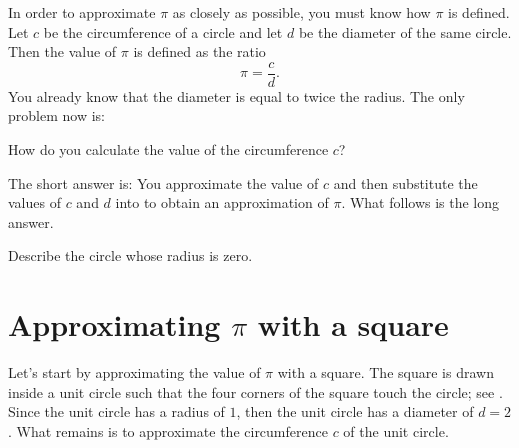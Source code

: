 \documentclass[a4paper,oneside,12pt]{article}
\begin{document}
In order to approximate $\pi$ as closely as possible, you must know
how $\pi$ is defined.  Let $c$ be the circumference of a circle and
let $d$ be the diameter of the same circle.  Then the value of $\pi$
is defined as the ratio
\begin{equation}
\label{eqn:define_pi_as_ratio_of_c_over_d}
\pi
=
\frac{c}{d}.
\end{equation}
You already know that the diameter is equal to twice the radius.  The
only problem now is:
\begin{packeditem}
\item How do you calculate the value of the circumference $c$?
\end{packeditem}
The short answer is: You approximate the value of $c$ and then
substitute the values of $c$ and $d$ into
 to obtain an
approximation of $\pi$.  What follows is the long answer.

\begin{exercise}
Describe the circle whose radius is zero.
\end{exercise}




\section{Approximating $\pi$ with a square}

Let's start by approximating the value of $\pi$ with a square.  The
square is drawn inside a unit circle such that the four corners of the
square touch the circle; see .
Since the unit circle has a radius of $1$, then the unit circle has a
diameter of $d = 2$.  What remains is to approximate the circumference
$c$ of the unit circle.
\end{document}
